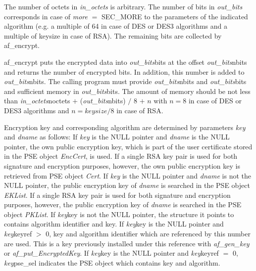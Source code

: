The number of octets in {\em in\_octets} is arbitrary. The number of bits in {\em out\_bits}
corresponds in case of {\em more} $=$ SEC\_MORE to the parameters of the indicated algorithm
(e.g. a multiple of 64 in case of DES or DES3 algorithms and a multiple of keysize
in case of RSA). The remaining bits are collected by af\_encrypt.

af\_encrypt puts the encrypted data into {\em out\_bits}\pf bits at the offset
{\em out\_bits}\pf nbits and returns the number of encrypted bits. In addition, this number is added 
to {\em out\_bits}\pf nbits.
The calling program must provide {\em out\_bits}\pf nbits and {\em out\_bits}\pf bits and sufficient
memory in {\em out\_bits}\pf bits.
The amount of memory should be not less than
{\em in\_octets}\pf noctets $+$ ({\em out\_bits}\pf nbits) $/$ 8 $+$ $n$ with $n = 8$ 
in case of DES or DES3 algorithms and $n = keysize / 8$ in case of RSA.

Encryption key and corresponding algorithm are determined by parameters {\em key} and {\em dname} as follows:
\be
\m If {\em key} is the NULL pointer and {\em dname} is the NULL pointer,
   the own public encryption key, which is part of the user certificate stored in the PSE object
   {\em EncCert}, is used.
   If a single RSA key pair is used for both signature and encryption purposes, however, the own public encryption key
   is retrieved from PSE object {\em Cert}.
\m If {\em key} is the NULL pointer and {\em dname} is not the NULL pointer,
   the public encryption key of {\em dname} is searched in the PSE object {\em EKList}.
   If a single RSA key pair is used for both signature and encryption purposes, however, the public encryption key of 
   {\em dname} is searched in the PSE object {\em PKList}.
\m If {\em key}\pf key is not the NULL pointer, the structure it points to
   contains algorithm identifier and key.
\m If {\em key}\pf key is the NULL pointer and {\em key}\pf keyref $>$ 0,
   key and algorithm identifier which are referenced by this number are used. This is a key
   previously installed under this reference with {\em af\_gen\_key} or 
   {\em af\_put\_EncryptedKey}.
\m If {\em key}\pf key is the NULL pointer and {\em key}\pf keyref $=$ 0,
   {\em key}\pf pse\_sel indicates the PSE object which contains key and algorithm.
\ee


